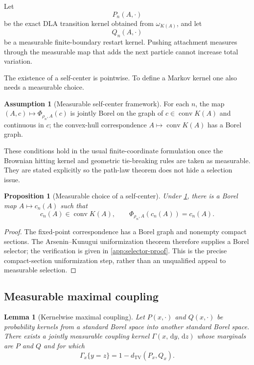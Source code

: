 \documentclass[11pt]{article}
\theoremstyle{mainthm}
\newtheorem{proposition}[proposition]{Proposition}
\newtheorem{lemma}[lemma]{Lemma}
\theoremstyle{definition}
\newtheorem{assumption}[assumption]{Assumption}
\theoremstyle{remark}
\newcommand{\dd}{\,\mathrm d}
\newcommand{\dTV}{d_{\mathrm{TV}}}
\newcommand{\conv}{\operatorname{conv}}
\begin{document}
Let
\[
  P_n(A,\cdot)
\]
be the exact DLA transition kernel obtained from $\omega_{K(A)}$, and let
\[
  Q_n(A,\cdot)
\]
be a measurable finite-boundary restart kernel. Pushing attachment measures through the measurable map that adds the next particle cannot increase total variation.

The existence of a self-center is pointwise. To define a Markov kernel one also needs a measurable choice.

\begin{assumption}[Measurable self-center framework]
\label{ass:measurable}
For each $n$, the map $(A,c)\mapsto\Phi_{\rho_n,A}(c)$ is jointly Borel on the graph of $c\in\conv K(A)$ and continuous in $c$; the convex-hull correspondence $A\mapsto\conv K(A)$ has a Borel graph.
\end{assumption}

These conditions hold in the usual finite-coordinate formulation once the Brownian hitting kernel and geometric tie-breaking rules are taken as measurable. They are stated explicitly so the path-law theorem does not hide a selection issue.

\begin{proposition}[Measurable choice of a self-center]
\label{prop:measurable-selector}
Under \cref{ass:measurable}, there is a Borel map $A\mapsto c_n(A)$ such that
\[
  c_n(A)\in\conv K(A),
  \qquad
  \Phi_{\rho_n,A}(c_n(A))=c_n(A).
\]
\end{proposition}

\begin{proof}
The fixed-point correspondence has a Borel graph and nonempty compact sections. The Arsenin--Kunugui uniformization theorem therefore supplies a Borel selector; the verification is given in \cref{app:selector-proof}. This is the precise compact-section uniformization step, rather than an unqualified appeal to measurable selection.
\end{proof}

\subsection{Measurable maximal coupling}

\begin{lemma}[Kernelwise maximal coupling]
\label{lem:maximal-kernel-coupling}
Let $P(x,\cdot)$ and $Q(x,\cdot)$ be probability kernels from a standard Borel space into another standard Borel space. There exists a jointly measurable coupling kernel $\Gamma(x,\dd y,\dd z)$ whose marginals are $P$ and $Q$ and for which
\[
  \Gamma_x\{y=z\}=1-\dTV(P_x,Q_x).
\]
\end{lemma}
\end{document}
